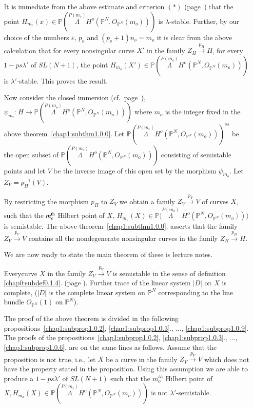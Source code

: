 It is immediate from the above estimate and criterion $(*)$ 
(page~\pageref{c0:*}) that the point $H_{m_o}(x) \in \mathbb{P}
(\overset{P{(m_o)}} \Lambda H^o (\mathbb{P}^N, O_{\mathbb{P}^N}
(m_o)))$ is $\lambda$-stable. Further, by our choice 
of the numbers $\varepsilon$, $p_o$ and $(p_o +1)n_o = m_o$ it is clear
from the above calculation that for every nonsingular curve $X'$ in the
family $Z_H \xrightarrow{p_H} H$, for every $1-ps \lambda'$ of
$SL(N+1)$, the point $H_{m_o}(X') \in
\mathbb{P}(\overset{P(m_o)} \Lambda H^o ( \mathbb{P}^N,
O_{\mathbb{P}^N}(m_o)))$ is $\lambda'$-stable. This proves the 
result. 


Now consider the closed immersion (cf.~page~\pageref{c1:cl.immersion}), 
$\psi_{m_o}: H \to\mathbb{P}(\overset{P(m_o)} \Lambda H^o ( \mathbb{P}^N,
 O_{\mathbb{P}^N}(m_o)))$ where $m_o$ is the integer fixed in the
 above theorem~\ref{chap1:subthm1.0.0}. Let
 $\mathbb{P}(\overset{P(m_o)} \Lambda H^o ( 
 \mathbb{P}^N, O_{\mathbb{P}^N}(m_o)))^{ss}$ be the open subset of
\break $\mathbb{P}(\overset{P{(m_o)}} \Lambda H^o(\mathbb{P}^N,
 O_{\mathbb{P}^N}(m_o)))$ consisting of semistable points and let
 $V$ 
 be the inverse image of this open set by the morphism
 $\psi_{m_o}$. Let $Z_V = p^{-1}_H(V)$. 
 
 \noindent
 By restricting the morphism $p_H$ to $Z_V$ we obtain a family $Z_V
 \xrightarrow{p_V} V$ of curves $X$, such that the $m_o^{\rm th}$ Hilbert
 point of $X$, $H_{m_o} (X)\in \mathbb{P}(\overset{P(m_o)}\Lambda$ $H^o
 ( \mathbb{P}^N, O_{\mathbb{P}^N} (m_o)))$ is 
 semistable. The above theorem~\ref{chap1:subthm1.0.0}. asserts that
 the family $Z_V 
 \xrightarrow{p_V}V$ contains all the nondegenerate nonsingular
 curves in the family $Z_H \xrightarrow{p_H}H$. 
 
 We are now ready to state the main theorem of these is lecture
 notes. 


 \begin{subtheorem}\label{chap1:subthm1.0.1} %
Every\pageoriginale curve $X$ in the family $Z_V \xrightarrow{p_V} V$
is semistable 
in the sense of definition \ref{chap0:subdef0.1.4}. (page
\pageref{chap0:subdef0.1.4}). Further 
trace of the 
linear system $|D|$ on $X$ is complete, ($|D|$ is the complete linear
system on $\mathbb{P}^N$ corresponding to the line bundle
$O_{\mathbb{P}^N}(1)$ on $\mathbb{P}^N$).    
 \end{subtheorem} 


\medskip
{}
The proof of the above theorem is divided in the following 
propositions~\ref{chap1:subprop1.0.2}, \ref{chap1:subprop1.0.3}., $\ldots$,
   \ref{chap1:subprop1.0.9}. The proofs of the 
 propositions~\ref{chap1:subprop1.0.2}, \ref{chap1:subprop1.0.3}., $\ldots$,
\ref{chap1:subprop1.0.6}. are on the same lines as 
follows. Assume that the proposition is not true, i.e., let $X$ be a
curve in the family $Z_V \xrightarrow{p_V} V$ which does not have the
property stated in the proposition. Using this assumption we are able
to produce a $1-ps \lambda'$ of $SL(N+1)$ such that the $m_o^{th}$
Hilbert point of $X,H_{m_o} (X) \in \mathbb{P}(\overset{P(m_o)}
\Lambda H^o ( \mathbb{P}^N, O_{\mathbb{P}^N}(m_o)))$ is not
$\lambda'$-semistable.  

